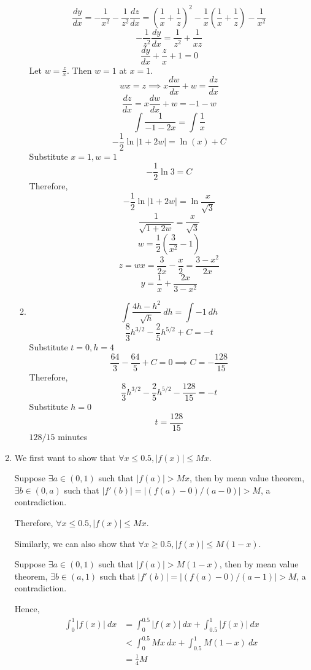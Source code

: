 \documentclass[12pt]{article}
\theoremstyle{definition}
\begin{document}
\begin{enumerate}
\begin{enumerate}[label=(\alph*)]
                \[\frac{dy}{dx} = -\frac{1}{x^2} - \frac{1}{z^2}\frac{dz}{dx} = \left(\frac{1}{x}+\frac{1}{z}\right)^2 - \frac{1}{x}\left(\frac{1}{x}+\frac{1}{z}\right) - \frac{1}{x^2}\]
                \[-\frac{1}{z^2}\frac{dy}{dx} = \frac{1}{z^2}+\frac{1}{xz}\]
                \[\frac{dy}{dx} + \frac{z}{x} + 1 = 0\]
                Let $w=\frac{z}{x}$. Then $w=1$ at $x=1$.
                \[wx=z \implies x\frac{dw}{dx} + w = \frac{dz}{dx}\]
                \[\frac{dz}{dx} = x\frac{dw}{dx} + w = -1-w\]
                \[\int \frac{1}{-1-2x} = \int\frac{1}{x}\]
                \[-\frac{1}{2}\ln|1+2w| = \ln(x)+C\]
                Substitute $x=1,w=1$
                \[-\frac{1}{2}\ln 3 = C\]
                Therefore,
                \[-\frac{1}{2}\ln|1+2w|=\ln\frac{x}{\sqrt{3}}\]
                \[\frac{1}{\sqrt{1+2w}}=\frac{x}{\sqrt{3}}\]
                \[w=\frac{1}{2}\left(\frac{3}{x^2}-1\right)\]
                \[z=wx=\frac{3}{2x}-\frac{x}{2} = \frac{3-x^2}{2x}\]
                \[y=\frac{1}{x} + \frac{2x}{3-x^2}\]
          \item \[\int\frac{4h-h^2}{\sqrt{h}}\ dh = \int -1\ dh\]
		        \[\frac{8}{3}h^{3/2} - \frac{2}{5}h^{5/2} + C = -t\]
		        Substitute $t=0,h=4$
		        \[\frac{64}{3}-\frac{64}{5}+C=0\implies C=-\frac{128}{15}\]
		        Therefore,
		        \[\frac{8}{3}h^{3/2} - \frac{2}{5}h^{5/2} -\frac{128}{15} = -t\]
		        Substitute $h=0$
		        \[t=\frac{128}{15}\]
		        $128/15$ minutes
        \end{enumerate}
  \item We first want to show that $\forall x\leq 0.5,|f(x)|\leq Mx$.
  
        Suppose $\exists a\in(0,1)$ such that $|f(a)|>Mx$, then by mean value theorem, $\exists b\in (0,a)$ such that $|f'(b)|=|(f(a)-0)/(a-0)|>M$, a contradiction.
        
        Therefore, $\forall x\leq 0.5,|f(x)|\leq Mx$.
        
        Similarly, we can also show that $\forall x\geq 0.5,|f(x)|\leq M(1-x)$.
        
        Suppose $\exists a\in(0,1)$ such that $|f(a)|>M(1-x)$, then by mean value theorem, $\exists b\in (a,1)$ such that $|f'(b)|=|(f(a)-0)/(a-1)|>M$, a contradiction.
        
        Hence,
        \begin{align*}
          \int_0^1 |f(x)|\ dx &= \int_0^{0.5} |f(x)|\ dx + \int_{0.5}^1 |f(x)|\ dx \\
            &< \int_0^{0.5} Mx\ dx + \int_{0.5}^1 M(1-x)\ dx \\
            &= \frac{1}{4}M
        \end{align*}
        
        
\end{enumerate}
\end{document}
